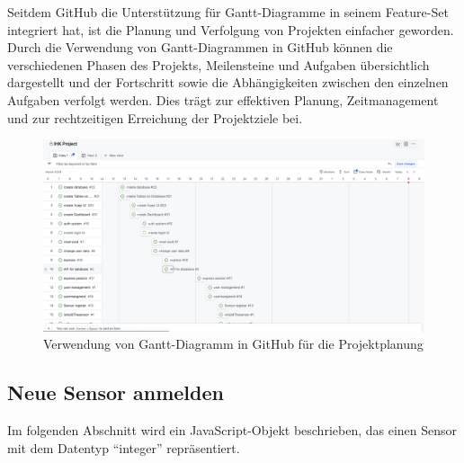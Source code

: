 Seitdem GitHub die Unterstützung für Gantt-Diagramme in seinem Feature-Set integriert hat, ist die Planung und Verfolgung von Projekten einfacher geworden. Durch die Verwendung von Gantt-Diagrammen in GitHub können die verschiedenen Phasen des Projekts, Meilensteine und Aufgaben übersichtlich dargestellt und der Fortschritt sowie die Abhängigkeiten zwischen den einzelnen Aufgaben verfolgt werden. Dies trägt zur effektiven Planung, Zeitmanagement und zur rechtzeitigen Erreichung der Projektziele bei.
\begin{figure}[h]
	\centering
	\includegraphics[width=1\textwidth]{img/github_diaramm.png}
	\caption{Verwendung von Gantt-Diagramm in GitHub für die Projektplanung}
	\label{fig:example}
\end{figure}
\clearpage


\subsection{Neue Sensor anmelden}\label{appendix:a3}\par
Im folgenden Abschnitt wird ein JavaScript-Objekt beschrieben, das einen Sensor mit dem Datentyp “integer” repräsentiert.


